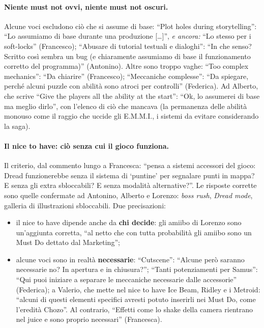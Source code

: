 \paragraph{Niente must not ovvi, niente must not oscuri.} Alcune voci
escludono ciò che si assume di base: ``Plot holes during storytelling'': ``Lo
assumiamo di base durante una produzione [\dots]'', \emph{e ancora:} ``Lo
stesso per i soft-locks'' (Francesco); ``Abusare di tutorial testuali e
dialoghi'': ``In che senso? Scritto così sembra un bug (e chiaramente
assumiamo di base il funzionamento corretto del programma)'' (Antonino).
Altre sono troppo vaghe: ``Too complex mechanics'': ``Da chiarire''
(Francesco); ``Meccaniche complesse'': ``Da spiegare, perché alcuni puzzle con
abilità sono atroci per controlli'' (Federica). Ad Alberto, che scrive ``Give
the players all the ability at the start'': ``Ok, lo assumerei di base ma
meglio dirlo'', con l'elenco di ciò che mancava (la permanenza delle abilità
monouso come il raggio che uccide gli E.M.M.I., i sistemi da evitare
considerando la saga).

\paragraph{Il nice to have: ciò senza cui il gioco funziona.} Il criterio, dal
commento lungo a Francesca: ``pensa a sistemi accessori del gioco: Dread
funzionerebbe senza il sistema di `puntine' per segnalare punti in mappa? E
senza gli extra sbloccabili? E senza modalità alternative?''. Le risposte
corrette sono quelle confermate ad Antonino, Alberto e Lorenzo: \emph{boss
rush}, \emph{Dread mode}, galleria di illustrazioni sbloccabili. Due
precisazioni:
\begin{itemize}
  \item il nice to have dipende anche da \textbf{chi decide}: gli amiibo di
        Lorenzo sono un'aggiunta corretta, ``al netto che con tutta
        probabilità gli amiibo sono un Must Do dettato dal Marketing'';
  \item alcune voci sono in realtà \textbf{necessarie}: ``Cutscene'':
        ``Alcune però saranno necessarie no? In apertura e in chiusura?'';
        ``Tanti potenziamenti per Samus'': ``Qui puoi iniziare a separare le
        meccaniche necessarie dalle accessorie'' (Federica); a Valerio, che
        mette nel nice to have Ice Beam, Ridley e i Metroid: ``alcuni di
        questi elementi specifici avresti potuto inserirli nei Must Do, come
        l'eredità Chozo''. Al contrario, ``Effetti come lo shake della camera
        rientrano nel juice e sono proprio necessari'' (Francesca).
\end{itemize}

